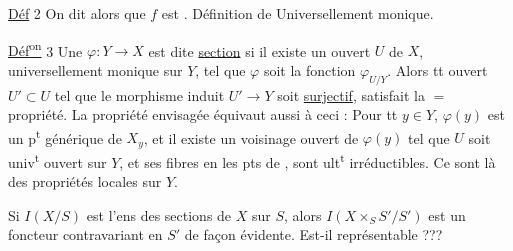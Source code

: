 \uline{Déf} 2 On dit alors que $f$ est \uline{}. Définition de Universellement monique.

\uline{Déf\textsuperscript{on}} 3 Une   $\varphi:Y\to X$ est dite \uline{section} \uline{} si il existe un ouvert $U$ de $X$, universellement monique sur $Y$, tel que $\varphi$ soit la fonction $\varphi_{U/Y}$.
 Alors tt  ouvert $U'\subset U$ tel que le morphisme induit $U'\to Y$ soit \uline{surjectif}, satisfait la $=$ propriété.
La propriété envisagée équivaut aussi à ceci : Pour tt $y\in Y$, $\varphi(y)$ est un p\textsuperscript{t} générique  de $X_y$, et il existe un  voisinage ouvert de $\varphi(y)$ tel que  $U$ soit univ\textsuperscript{t} ouvert sur $Y$, et  ses fibres en les pts de , sont ult\textsuperscript{t} irréductibles. Ce sont là des propriétés locales sur $Y$.

Si $I(X/S)$ est l'ens des sections  de $X$ sur $S$, alors $I(X\times_S S'/S')$ est un foncteur contravariant en $S'$ de façon évidente. Est-il représentable ???

